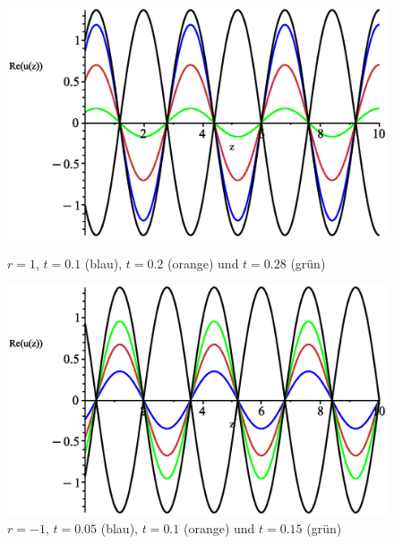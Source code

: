 \documentclass[paper=a4, parskip=half-, ngerman, fontsize=11pt]{scrreprt}
\begin{document}
\begin{figure}[!htpb]
    \begin{minipage}{0.45\textwidth}
        \centering
        \includegraphics[width=\linewidth]{../graphics/Enveloppe/verlustlos/R1}
        \caption*{$r=1$, $t=0.1$ (blau), $t=0.2$ (orange) und $t=0.28$ (grün)}
    \end{minipage}\hfill
    \begin{minipage}{0.45\textwidth}
        \centering
        \includegraphics[width=\linewidth]{../graphics/Enveloppe/verlustlos/R-1}
        \caption*{$r=-1$, $t=0.05$ (blau), $t=0.1$ (orange) und $t=0.15$ (grün)}
    \end{minipage}

    \label{WellenausbreitungVerlustlos}

\end{figure}
\end{document}
